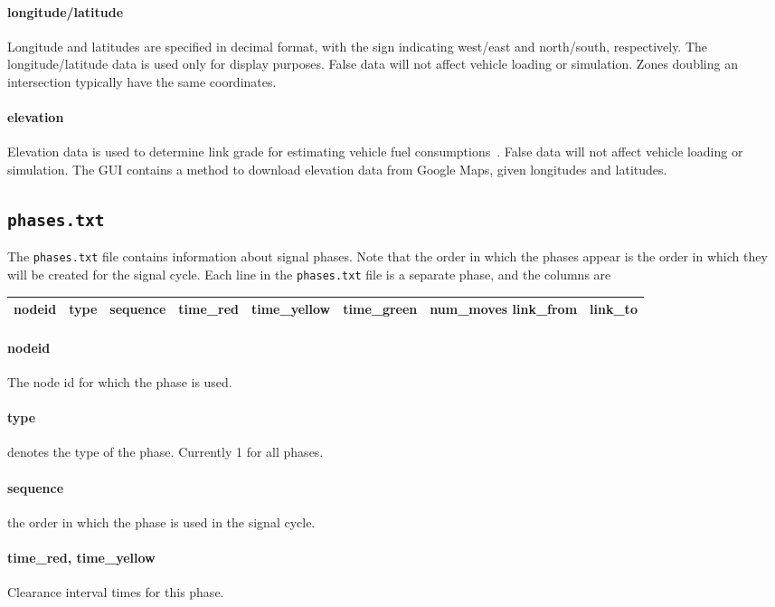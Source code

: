 \paragraph*{longitude/latitude}
Longitude and latitudes are specified in decimal format, with the sign indicating west/east and north/south, respectively. The longitude/latitude data is used only for display purposes. False data will not affect vehicle loading or simulation. Zones doubling an intersection typically have the same coordinates.

\paragraph*{elevation}
Elevation data is used to determine link grade for estimating vehicle fuel consumptions~\cite{levin2014effect}. False data will not affect vehicle loading or simulation. The GUI contains a method to download elevation data from Google Maps, given longitudes and latitudes.

\subsection{\texttt{phases.txt}}
The \texttt{phases.txt} file contains information about signal phases. Note that the order in which the phases appear is the order in which they will be created for the signal cycle. Each line in the \texttt{phases.txt} file is a separate phase, and the columns are
\begin{center}
\begin{tabular}{ccccccc}
\hline
nodeid & type & sequence & time\_red & time\_yellow & time\_green & num\_moves	link\_from & link\_to\\\hline
\end{tabular}
\end{center}
\paragraph*{nodeid} The node id for which the phase is used.
\paragraph*{type} denotes the type of the phase. Currently 1 for all phases.
\paragraph*{sequence} the order in which the phase is used in the signal cycle.
\paragraph*{time\_red, time\_yellow} Clearance interval times for this phase.

